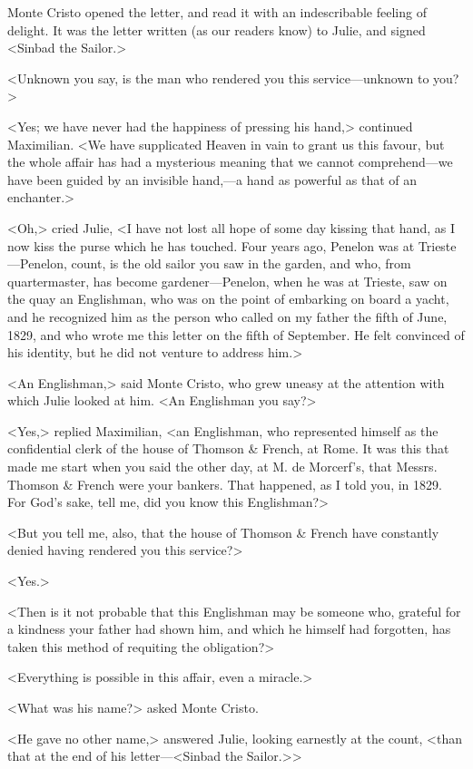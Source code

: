  Monte Cristo opened the letter, and read it with an indescribable feeling of delight. It was the letter written (as our readers know) to Julie, and signed <Sinbad the Sailor.> 

 <Unknown you say, is the man who rendered you this service—unknown to you?> 

 <Yes; we have never had the happiness of pressing his hand,> continued Maximilian. <We have supplicated Heaven in vain to grant us this favour, but the whole affair has had a mysterious meaning that we cannot comprehend—we have been guided by an invisible hand,—a hand as powerful as that of an enchanter.> 

 <Oh,> cried Julie, <I have not lost all hope of some day kissing that hand, as I now kiss the purse which he has touched. Four years ago, Penelon was at Trieste—Penelon, count, is the old sailor you saw in the garden, and who, from quartermaster, has become gardener—Penelon, when he was at Trieste, saw on the quay an Englishman, who was on the point of embarking on board a yacht, and he recognized him as the person who called on my father the fifth of June, 1829, and who wrote me this letter on the fifth of September. He felt convinced of his identity, but he did not venture to address him.> 

 <An Englishman,> said Monte Cristo, who grew uneasy at the attention with which Julie looked at him. <An Englishman you say?> 

 <Yes,> replied Maximilian, <an Englishman, who represented himself as the confidential clerk of the house of Thomson \& French, at Rome. It was this that made me start when you said the other day, at M. de Morcerf's, that Messrs. Thomson \& French were your bankers. That happened, as I told you, in 1829. For God's sake, tell me, did you know this Englishman?> 

 <But you tell me, also, that the house of Thomson \& French have constantly denied having rendered you this service?> 

 <Yes.> 

 <Then is it not probable that this Englishman may be someone who, grateful for a kindness your father had shown him, and which he himself had forgotten, has taken this method of requiting the obligation?> 

 <Everything is possible in this affair, even a miracle.> 

 <What was his name?> asked Monte Cristo. 

 <He gave no other name,> answered Julie, looking earnestly at the count, <than that at the end of his letter—<Sinbad the Sailor.>> 

